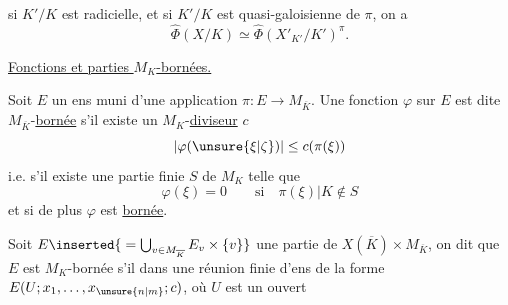 si $K'/K$ est radicielle, et   si $K'/K$ est quasi-galoisienne de  $\pi$, on a
\[
\widehat{\Phi}(X/K)\simeq\widehat{\Phi}(X'_{K'}/K')^{\pi}.
\]

\uline{Fonctions et parties $M_K$-bornées.}


Soit $E$ un ens muni d'une application $\pi:E\longrightarrow M_{\overline K}$. Une fonction $\varphi$ sur $E$ est dite $M_{\overline K}$-\uline{bornée}  s'il existe un $M_K$-\uline{diviseur} $c$  
\[
|\varphi(\unsure{\xi|\zeta})|\leq c(\pi(\xi))
\]
i.e. s'il existe une partie finie $S$ de $M_K$  telle que
\[
\varphi(\xi)=0\qquad\text{si}\quad \pi(\xi)|K\notin S
\]
et si de plus $\varphi$ est \uline{bornée}. 

Soit $E\inserted{{}=\bigcup_{v\in M_{\overline K}} E_v\times\{v\}}$ une partie de $X(\overline K)\times M_{\overline K}$, on dit que $E$ est $M_K$-bornée s'il   dans une réunion finie d'ens de la forme $E(U;x_1,\ldots,x_{\unsure{n|m}};c)$, où $U$ est un ouvert
